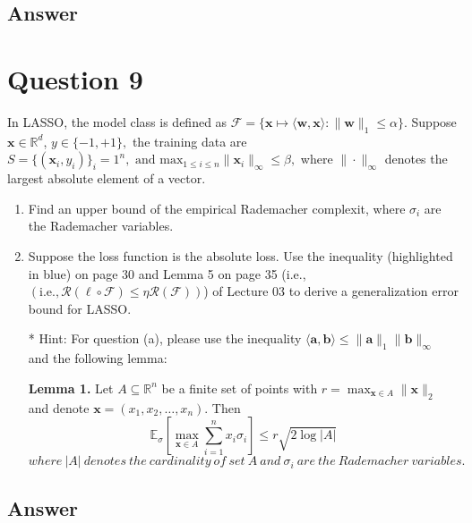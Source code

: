 \documentclass[
	12pt, %
]{fphw}
\begin{document}
\subsection*{Answer}


\section*{Question 9}

\begin{problem}
In LASSO, the model class is defined as $\mathcal{F}=\{\mathbf{x}\mapsto\langle\mathbf{w},\mathbf{x}\rangle:\|\mathbf{w}\|_1\leq\alpha\}.$ Suppose $\mathbf{x}\in\mathbb{R}^d$, $y\in \{ - 1, + 1\} , $ the training data are $S= \{ ( \mathbf{x} _i, y_i) \} _i= 1^n, \text{ and max}_{1\leq i\leq n}\|\mathbf{x} _i\|_\infty\leq \beta, $ where $\|\cdot \|_\infty$ denotes the largest absolute element of a vector.
\begin{enumerate}
\item Find an upper bound of the empirical Rademacher complexit, where $\sigma_i$ are the Rademacher variables. 
\item Suppose the loss function is the absolute loss. Use the inequality (highlighted in blue) on page
$30$ and Lemma 5 on page 35 (i.e., $(\mathrm{i.e.},\mathcal{R}(\ell\circ\mathcal{F})\leq\eta\mathcal{R}(\mathcal{F}))$) of Lecture 03 to derive a generalization error bound for LASSO.


  * Hint: For question (a), please use the inequality $\langle\mathbf{a},\mathbf{b}\rangle\leq\|\mathbf{a}\|_1\|\mathbf{b}\|_\infty$ and the following lemma:


  \textbf{Lemma 1.} Let \( A \subseteq \mathbb{R}^n \) be a finite set of points with \( r = \max_{\mathbf{x} \in A} \|\mathbf{x}\|_2 \) and denote \( \mathbf{x} = (x_1, x_2, \ldots, x_n) \). Then
  $$\mathbb{E}_{\sigma}\left[\max_{\mathbf{x}\in A}\sum_{i=1}^nx_i\sigma_i\right]\leq r\sqrt{2\log|A|}$$
$where\:|A|\:denotes\:the\:cardinality\:of\:set\:A\:and\:\sigma_i\:are\:the\:Rademacher\:variables.$
\end{enumerate}
\end{problem}
\subsection*{Answer}







\end{document}
